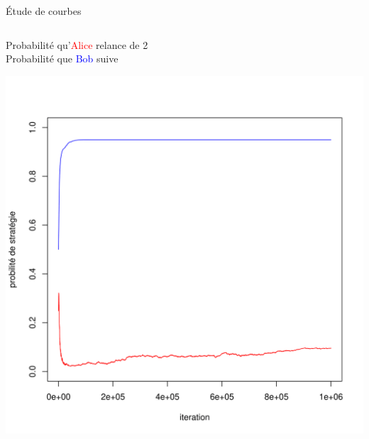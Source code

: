 \begin{frame}{Étude de courbes}
\begin{columns}
        \begin{column}{0.5 \textwidth}
         \begin{small}
          \hspace{-0.24 cm} Probabilité qu'\textcolor{red}{Alice} relance de 2\\ Probabilité que \textcolor{blue}{Bob} suive\\
          \end{small}
        \centering
            \includegraphics[width =\textwidth]{Images/Courbes/LRI/Relance2.png}
       
    \end{column}
    \end{columns}
\end{frame}

